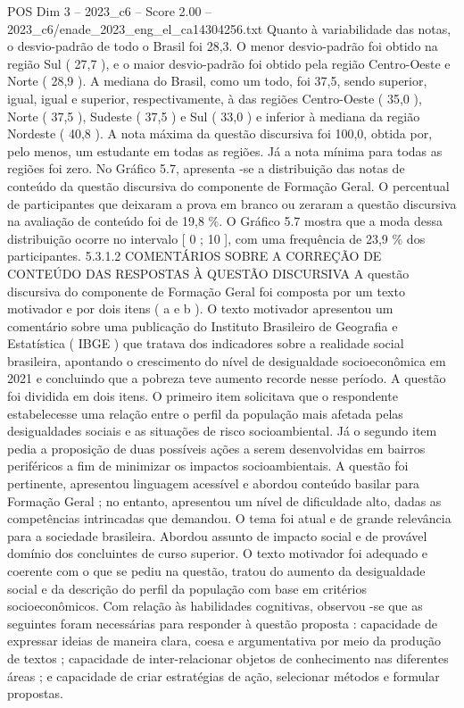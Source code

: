 \begin{textsample}{POS Dim 3 – 2023\_c6 – Score 2.00 – 2023\_c6/enade\_2023\_eng\_el\_ca14304256.txt}
Quanto à variabilidade das notas, o desvio-padrão de todo o Brasil foi 28,3.
O menor desvio-padrão foi obtido na região Sul ( 27,7 ), e o maior desvio-padrão foi obtido pela região Centro-Oeste e Norte ( 28,9 ).
A mediana do Brasil, como um todo, foi 37,5, sendo superior, igual, igual e superior, respectivamente, à das regiões Centro-Oeste ( 35,0 ), Norte ( 37,5 ), Sudeste ( 37,5 ) e Sul ( 33,0 ) e inferior à mediana da região Nordeste ( 40,8 ).
A nota máxima da questão discursiva foi 100,0, obtida por, pelo menos, um estudante em todas as regiões.
Já a nota mínima para todas as regiões foi zero.
No Gráfico 5.7, apresenta -se a distribuição das notas de conteúdo da questão discursiva do componente de Formação Geral.
O percentual de participantes que deixaram a prova em branco ou zeraram a questão discursiva na avaliação de conteúdo foi de 19,8 \%.
O Gráfico 5.7 mostra que a moda dessa distribuição ocorre no intervalo [ 0 ; 10 ], com uma frequência de 23,9 \% dos participantes. 5.3.1.2 COMENTÁRIOS SOBRE A CORREÇÃO DE CONTEÚDO DAS RESPOSTAS À QUESTÃO DISCURSIVA A questão discursiva do componente de Formação Geral foi composta por um texto motivador e por dois itens ( a e b ).
O texto motivador apresentou um comentário sobre uma publicação do Instituto Brasileiro de Geografia e Estatística ( IBGE ) que tratava dos indicadores sobre a realidade social brasileira, apontando o crescimento do nível de desigualdade socioeconômica em 2021 e concluindo que a pobreza teve aumento recorde nesse período.
A questão foi dividida em dois itens.
O primeiro item solicitava que o respondente estabelecesse uma relação entre o perfil da população mais afetada pelas desigualdades sociais e as situações de risco socioambiental.
Já o segundo item pedia a proposição de duas possíveis ações a serem desenvolvidas em bairros periféricos a fim de minimizar os impactos socioambientais.
A questão foi pertinente, apresentou linguagem acessível e abordou conteúdo basilar para Formação Geral ; no entanto, apresentou um nível de dificuldade alto, dadas as competências intrincadas que demandou.
O tema foi atual e de grande relevância para a sociedade brasileira.
Abordou assunto de impacto social e de provável domínio dos concluintes de curso superior.
O texto motivador foi adequado e coerente com o que se pediu na questão, tratou do aumento da desigualdade social e da descrição do perfil da população com base em critérios socioeconômicos.
Com relação às habilidades cognitivas, observou -se que as seguintes foram necessárias para responder à questão proposta : capacidade de expressar ideias de maneira clara, coesa e argumentativa por meio da produção de textos ; capacidade de inter-relacionar objetos de conhecimento nas diferentes áreas ; e capacidade de criar estratégias de ação, selecionar métodos e formular propostas.

\end{textsample}
